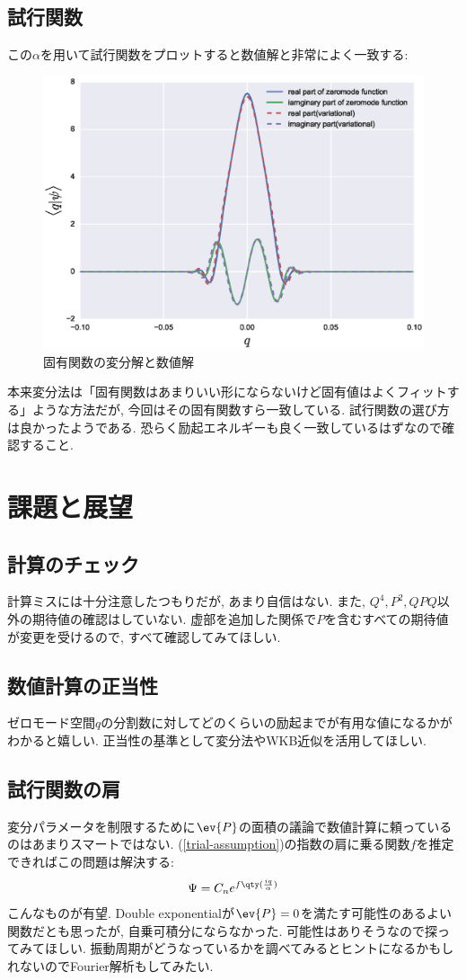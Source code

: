 \documentclass[10.5pt,a4paper]{jreport}
\begin{document}
\subsection{試行関数}
この$\alpha$を用いて試行関数をプロットすると数値解と非常によく一致する:
\begin{figure}[H]
  \begin{center}
    \includegraphics[width = 12cm]{./EPS/psi_var.eps}
    \caption{固有関数の変分解と数値解}\label{psi_var}
  \end{center}
\end{figure} 
本来変分法は「固有関数はあまりいい形にならないけど固有値はよくフィットする」ような方法だが, 今回はその固有関数すら一致している. 試行関数の選び方は良かったようである. 恐らく励起エネルギーも良く一致しているはずなので確認すること.

\section{課題と展望} 
\subsection{計算のチェック}
計算ミスには十分注意したつもりだが, あまり自信はない. また, $Q^4, P^2, QPQ$以外の期待値の確認はしていない. 虚部を追加した関係で$P$を含むすべての期待値が変更を受けるので, すべて確認してみてほしい.
\subsection{数値計算の正当性}
ゼロモード空間$q$の分割数に対してどのくらいの励起までが有用な値になるかがわかると嬉しい. 正当性の基準として変分法やWKB近似を活用してほしい. 
\subsection{試行関数の肩}
変分パラメータを制限するために$\ev{P}$の面積の議論で数値計算に頼っているのはあまりスマートではない. (\ref{trial-assumption})の指数の肩に乗る関数$f$を推定できればこの問題は解決する:
\begin{eqnarray}
  \Psi = C_ne^{f\qty(\frac{iq}{\alpha})}
\end{eqnarray}
こんなものが有望. Double exponentialが$\ev{P}=0$を満たす可能性のあるよい関数だとも思ったが, 自乗可積分にならなかった. 可能性はありそうなので探ってみてほしい. 振動周期がどうなっているかを調べてみるとヒントになるかもしれないのでFourier解析もしてみたい.
\end{document}
